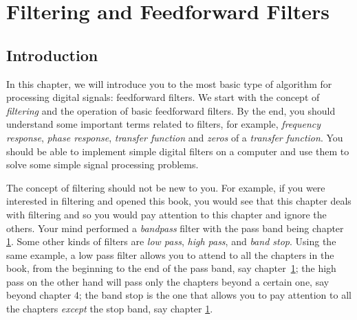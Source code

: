 
%
%
%
%
%
%
%
%

\chapter{Filtering and Feedforward Filters}
\label{ch:filt-intro}

\section{Introduction}

In this chapter, we will introduce you to the most basic type of
algorithm for processing digital signals: feedforward filters. We
start with the concept of \emph{filtering} and the operation of basic
feedforward filters. By the end, you should understand some important
terms related to filters, for example, \emph{frequency response},
\emph{phase response}, \emph{transfer function} and \emph{zeros} of a
\emph{transfer function}. You should be able to implement simple
digital filters on a computer and use them to solve some simple signal
processing problems.

The concept of filtering should not be new to you. For example, if you
were interested in filtering and opened this book, you would see that
this chapter deals with filtering and so you would pay attention to
this chapter and ignore the others.  Your mind performed a
\emph{bandpass} filter with the pass  band
being chapter \ref{ch:filt-intro}.  Some other kinds of filters are
\emph{low pass}, \emph{high pass}, and \emph{band stop}.  Using the
same example, a low pass filter  allows you to
attend to all the chapters in the book, from the beginning to the end
of the pass band, say chapter~\ref{ch:filt-intro}; the high pass on
 the other hand will pass only the chapters
beyond a certain one, say beyond chapter 4; the band stop is the one
 that allows you to pay attention to all the
chapters \emph{except} the stop band, say chapter \ref{ch:filt-intro}.

